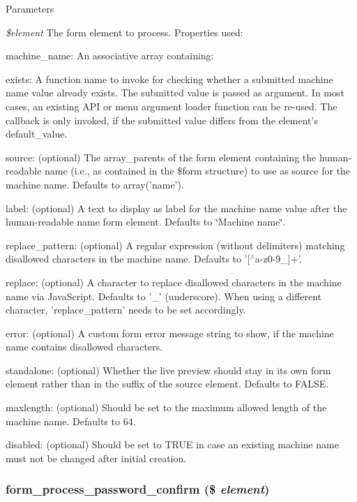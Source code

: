 \begin{DoxyParams}{Parameters}
\item[{\em \$element}]The form element to process. Properties used:
\begin{DoxyItemize}
\item machine\_\-name: An associative array containing:
\begin{DoxyItemize}
\item exists: A function name to invoke for checking whether a submitted machine name value already exists. The submitted value is passed as argument. In most cases, an existing API or menu argument loader function can be re-\/used. The callback is only invoked, if the submitted value differs from the element's default\_\-value.
\item source: (optional) The array\_\-parents of the form element containing the human-\/readable name (i.e., as contained in the \$form structure) to use as source for the machine name. Defaults to array('name').
\item label: (optional) A text to display as label for the machine name value after the human-\/readable name form element. Defaults to \char`\"{}Machine name\char`\"{}.
\item replace\_\-pattern: (optional) A regular expression (without delimiters) matching disallowed characters in the machine name. Defaults to '\mbox{[}$^\wedge$a-\/z0-\/9\_\-\mbox{]}+'.
\item replace: (optional) A character to replace disallowed characters in the machine name via JavaScript. Defaults to '\_\-' (underscore). When using a different character, 'replace\_\-pattern' needs to be set accordingly.
\item error: (optional) A custom form error message string to show, if the machine name contains disallowed characters.
\item standalone: (optional) Whether the live preview should stay in its own form element rather than in the suffix of the source element. Defaults to FALSE.
\end{DoxyItemize}
\item maxlength: (optional) Should be set to the maximum allowed length of the machine name. Defaults to 64.
\item disabled: (optional) Should be set to TRUE in case an existing machine name must not be changed after initial creation. 
\end{DoxyItemize}\end{DoxyParams}
\hypertarget{group__form__api_gae3a3dcd1a5e4e44c5c03bb1426066596}{
\subsubsection[{form\_\-process\_\-password\_\-confirm}]{\setlength{\rightskip}{0pt plus 5cm}form\_\-process\_\-password\_\-confirm (\$ {\em element})}}
